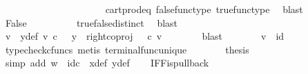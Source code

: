 \begin{isabellebody}
\ \ \ \ \ \ \isamarkupfalse%
\ \isamarkupfalse%
\ {\isachardoublequoteopen}{\isasymt}\ {\isacharequal}{\kern0pt}\ {\isasymf}{\isachardoublequoteclose}\isanewline
\ \ \ \ \ \ \ \ \isamarkupfalse%
\ cart{\isacharunderscore}{\kern0pt}prod{\isacharunderscore}{\kern0pt}eq{}\ false{\isacharunderscore}{\kern0pt}func{\isacharunderscore}{\kern0pt}type\ true{\isacharunderscore}{\kern0pt}func{\isacharunderscore}{\kern0pt}type\ \isamarkupfalse%
\ blast\isanewline
\ \ \ \ \ \ \isamarkupfalse%
\ \isamarkupfalse%
\ False\isanewline
\ \ \ \ \ \ \ \ \isamarkupfalse%
\ true{\isacharunderscore}{\kern0pt}false{\isacharunderscore}{\kern0pt}distinct\ \isamarkupfalse%
\ blast\isanewline
\ \ \ \ \isamarkupfalse%
\isanewline
\ \ \ \ \isamarkupfalse%
\ \isamarkupfalse%
\ v\ \ y{\isacharunderscore}{\kern0pt}def{\isacharcolon}{\kern0pt}\ {\isachardoublequoteopen}v\ {\isasymin}\isactrlsub c\ {\isasymone}\ {\isasymand}\ y\ {\isacharequal}{\kern0pt}\ {\isacharparenleft}{\kern0pt}right{\isacharunderscore}{\kern0pt}coproj\ {\isasymone}\ {\isasymone}{\isacharparenright}{\kern0pt}\ {\isasymcirc}\isactrlsub c\ v{\isachardoublequoteclose}\isanewline
\ \ \ \ \ \ \isamarkupfalse%
\ blast\isanewline
\ \ \ \ \isamarkupfalse%
\ \isamarkupfalse%
\ {\isachardoublequoteopen}v\ {\isacharequal}{\kern0pt}\ id\ {\isasymone}{\isachardoublequoteclose}\isanewline
\ \ \ \ \ \ \isamarkupfalse%
\ {\isacharparenleft}{\kern0pt}typecheck{\isacharunderscore}{\kern0pt}cfuncs{\isacharcomma}{\kern0pt}\ metis\ terminal{\isacharunderscore}{\kern0pt}func{\isacharunderscore}{\kern0pt}unique{\isacharparenright}{\kern0pt}\isanewline
\ \ \ \ \isamarkupfalse%
\ \isamarkupfalse%
\ {\isacharquery}{\kern0pt}thesis\isanewline
\ \ \ \ \ \ \isamarkupfalse%
\ {\isacharparenleft}{\kern0pt}simp\ add{\isacharcolon}{\kern0pt}\ {\isacartoucheopen}w\ {\isacharequal}{\kern0pt}\ id\isactrlsub c\ {\isasymone}{\isacartoucheclose}\ x{\isacharunderscore}{\kern0pt}def\ y{\isacharunderscore}{\kern0pt}def{\isacharparenright}{\kern0pt}\isanewline
\ \ \isamarkupfalse%
\isanewline
{}\isamarkupfalse%
%
\endisatagproof
{\isafoldproof}%
%
\isadelimproof
\isanewline
%
\endisadelimproof
\isanewline
{}\isamarkupfalse%
\ IFF{\isacharunderscore}{\kern0pt}is{\isacharunderscore}{\kern0pt}pullback{\isacharcolon}{\kern0pt}\isanewline

\end{isabellebody}
